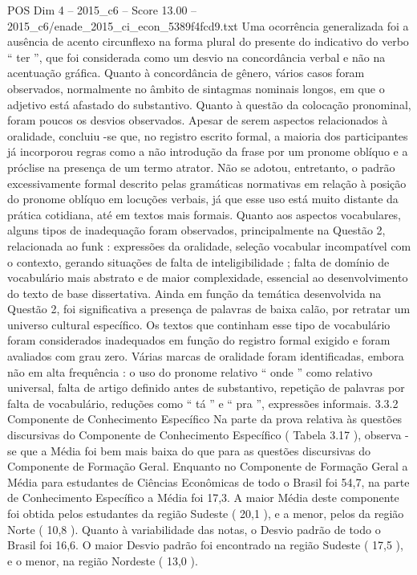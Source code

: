 \begin{textsample}{POS Dim 4 – 2015\_c6 – Score 13.00 – 2015\_c6/enade\_2015\_ci\_econ\_5389f4fcd9.txt}
Uma ocorrência generalizada foi a ausência de acento circunflexo na forma plural do presente do indicativo do verbo “ ter ”, que foi considerada como um desvio na concordância verbal e não na acentuação gráfica.
Quanto à concordância de gênero, vários casos foram observados, normalmente no âmbito de sintagmas nominais longos, em que o adjetivo está afastado do substantivo.
Quanto à questão da colocação pronominal, foram poucos os desvios observados.
Apesar de serem aspectos relacionados à oralidade, concluiu -se que, no registro escrito formal, a maioria dos participantes já incorporou regras como a não introdução da frase por um pronome oblíquo e a próclise na presença de um termo atrator.
Não se adotou, entretanto, o padrão excessivamente formal descrito pelas gramáticas normativas em relação à posição do pronome oblíquo em locuções verbais, já que esse uso está muito distante da prática cotidiana, até em textos mais formais.
Quanto aos aspectos vocabulares, alguns tipos de inadequação foram observados, principalmente na Questão 2, relacionada ao funk : expressões da oralidade, seleção vocabular incompatível com o contexto, gerando situações de falta de inteligibilidade ; falta de domínio de vocabulário mais abstrato e de maior complexidade, essencial ao desenvolvimento do texto de base dissertativa.
Ainda em função da temática desenvolvida na Questão 2, foi significativa a presença de palavras de baixa calão, por retratar um universo cultural específico.
Os textos que continham esse tipo de vocabulário foram considerados inadequados em função do registro formal exigido e foram avaliados com grau zero.
Várias marcas de oralidade foram identificadas, embora não em alta frequência : o uso do pronome relativo “ onde ” como relativo universal, falta de artigo definido antes de substantivo, repetição de palavras por falta de vocabulário, reduções como “ tá ” e “ pra ”, expressões informais. 3.3.2 Componente de Conhecimento Específico Na parte da prova relativa às questões discursivas do Componente de Conhecimento Específico ( Tabela 3.17 ), observa -se que a Média foi bem mais baixa do que para as questões discursivas do Componente de Formação Geral.
Enquanto no Componente de Formação Geral a Média para estudantes de Ciências Econômicas de todo o Brasil foi 54,7, na parte de Conhecimento Específico a Média foi 17,3.
A maior Média deste componente foi obtida pelos estudantes da região Sudeste ( 20,1 ), e a menor, pelos da região Norte ( 10,8 ).
Quanto à variabilidade das notas, o Desvio padrão de todo o Brasil foi 16,6.
O maior Desvio padrão foi encontrado na região Sudeste ( 17,5 ), e o menor, na região Nordeste ( 13,0 ).

\end{textsample}
